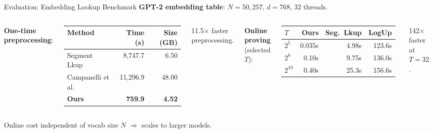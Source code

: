 \documentclass[aspectratio=169,10pt]{beamer}
\newcommand{\pos}[1]{\textcolor{positive}{#1}}
\begin{document}
\begin{frame}{Evaluation: Embedding Lookup Benchmark}
\textbf{GPT-2 embedding table}: $N = 50{,}257$, $d = 768$, 32 threads.

\vspace{4pt}
\begin{columns}[T]
\textbf{One-time preprocessing}:

\vspace{2pt}
\begin{tabular}{@{}lrr@{}}
\toprule
Method & Time (s) & Size (GB) \\
\midrule
Segment Lkup & 8,747.7 & 6.50 \\
Campanelli et al. & 11,296.9 & 48.00 \\
\textbf{Ours} & \pos{\textbf{759.9}} & \pos{\textbf{4.52}} \\
\bottomrule
\end{tabular}

\pos{11.5$\times$} faster preprocessing.

\textbf{Online proving} (selected $T$):

\vspace{2pt}
\begin{tabular}{@{}lrrr@{}}
\toprule
$T$ & Ours & Seg.\ Lkup & LogUp \\
\midrule
$2^5$ & \pos{0.035s} & 4.98s & 123.6s \\
$2^8$ & \pos{0.10s} & 9.75s & 136.0s \\
$2^{10}$ & \pos{0.40s} & 25.3s & 156.6s \\
\bottomrule
\end{tabular}

\pos{142$\times$} faster at $T = 32$.
\end{columns}

\vspace{6pt}
Online cost independent of vocab size $N$ $\Rightarrow$ \pos{scales to larger models}.
\end{frame}
\end{document}
